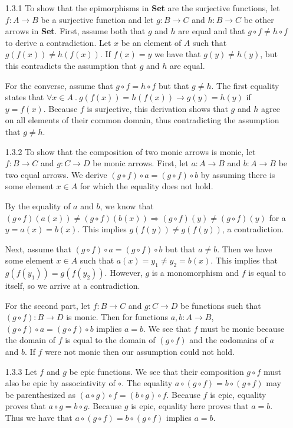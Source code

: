 \documentclass{article}
\begin{document}
\begin{enumerate}
\item[1.3.1]
  To show that the epimorphisms in \textbf{Set} are the surjective functions, let $f : A \rightarrow B$ be a surjective function and let $g : B \rightarrow C$ and $h : B \rightarrow C$ be other arrows in \textbf{Set}.
  First, assume both that $g$ and $h$ are equal and that $g \circ f \ne h \circ f$ to derive a contradiction.
  Let $x$ be an element of $A$ such that $g(f(x)) \ne h(f(x))$.
  If $f(x) = y$ we have that $g(y) \ne h(y)$, but this contradicts the assumption that $g$ and $h$ are equal.

  For the converse, assume that $g \circ f = h \circ f$ but that $g \ne h$.
  The first equality states that $\forall x\in A~.~g(f(x)) = h(f(x)) \rightarrow g(y) = h(y)$ if $y = f(x)$.
  Because $f$ is surjective, this derivation shows that $g$ and $h$ agree on all elements of their common domain, thus contradicting the assumption that $g \ne h$.

\item [1.3.2]
  To show that the composition of two monic arrows is monic, let $f : B \rightarrow C$ and $g : C \rightarrow D$ be monic arrows.
  First, let $a : A \rightarrow B$ and $b : A \rightarrow B$ be two equal arrows.
  We derive $(g \circ f) \circ a = (g \circ f) \circ b$ by assuming there is some element $x \in A$ for which the equality does not hold.

  By the equality of $a$ and $b$, we know that $(g\circ f)(a(x)) \ne (g\circ f)(b(x)) \Rightarrow (g\circ f)(y) \ne (g\circ f)(y)$ for a $y = a(x) = b(x)$.
  This implies $g(f(y)) \ne g(f(y))$, a contradiction.

  Next, assume that $(g\circ f) \circ a = (g\circ f) \circ b$ but that $a \ne b$.
  Then we have some element $x \in A$ such that $a(x) = y_1 \ne y_2 = b(x)$.
  This implies that $g(f(y_1)) = g(f(y_2))$.
  However, $g$ is a monomorphism and $f$ is equal to itself, so we arrive at a contradiction.

  For the second part, let $f : B \rightarrow C$ and $g : C \rightarrow D$ be functions such that $(g \circ f) : B \rightarrow D$ is monic.
  Then for functions $a,b : A \rightarrow B$, $(g \circ f) \circ a = (g \circ f) \circ b$ implies $a = b$.
  We see that $f$ must be monic because the domain of $f$ is equal to the domain of $(g \circ f)$ and the codomains of $a$ and $b$.
  If $f$ were not monic then our assumption could not hold.

\item[]
\item[1.3.3]
  Let $f$ and $g$ be epic functions.
  We see that their composition $g \circ f$ must also be epic by associativity of $\circ$.
  The equality $a \circ (g \circ f) = b \circ (g \circ f)$ may be parenthesized as $(a \circ g) \circ f = (b \circ g) \circ f$.
  Because $f$ is epic, equality proves that $a \circ g = b \circ g$.
  Because $g$ is epic, equality here proves that $a = b$.
  Thus we have that $a \circ (g \circ f) = b \circ (g \circ f)$ implies $a = b$.


\end{enumerate}
\end{document}
